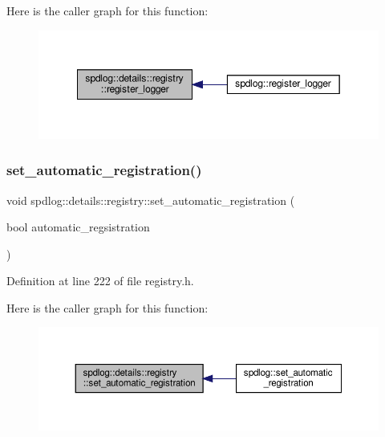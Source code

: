 Here is the caller graph for this function\+:
\nopagebreak
\begin{figure}[H]
\begin{center}
\leavevmode
\includegraphics[width=349pt]{classspdlog_1_1details_1_1registry_ab77fb7513b2e3e6442a83f037543e391_icgraph}
\end{center}
\end{figure}
\mbox{\label{classspdlog_1_1details_1_1registry_a0cfc3780c18f5331ad31ea1d40248952}} 
\subsubsection{\texorpdfstring{set\+\_\+automatic\+\_\+registration()}{set\_automatic\_registration()}}
{\footnotesize\ttfamily void spdlog\+::details\+::registry\+::set\+\_\+automatic\+\_\+registration (\begin{DoxyParamCaption}\item[{bool}]{automatic\+\_\+regsistration }\end{DoxyParamCaption})\hspace{0.3cm}{\ttfamily [inline]}}



Definition at line 222 of file registry.\+h.

Here is the caller graph for this function\+:
\nopagebreak
\begin{figure}[H]
\begin{center}
\leavevmode
\includegraphics[width=350pt]{classspdlog_1_1details_1_1registry_a0cfc3780c18f5331ad31ea1d40248952_icgraph}
\end{center}
\end{figure}
\mbox{\label{classspdlog_1_1details_1_1registry_ae2a45628046a1d0cd3f8de81a5556acb}} 
